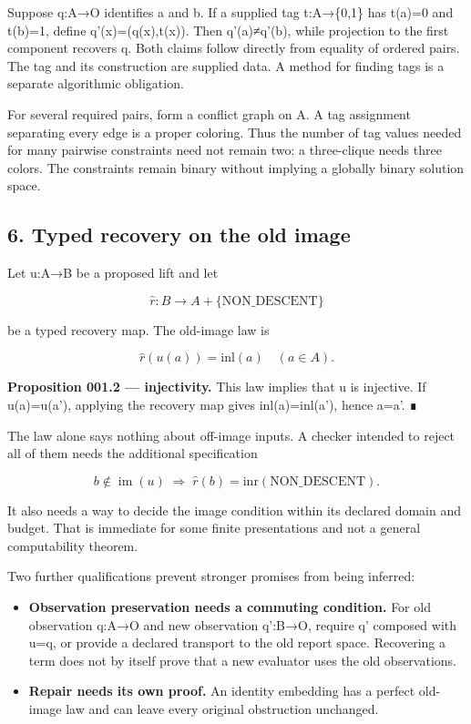 \documentclass[
  11pt,
]{article}
\providecommand{\tightlist}{%
  \setlength{\itemsep}{0pt}\setlength{\parskip}{0pt}}
\begin{document}
Suppose q:A→O identifies a and b. If a supplied tag t:A→\{0,1\} has
t(a)=0 and t(b)=1, define q'(x)=(q(x),t(x)). Then q'(a)≠q'(b), while
projection to the first component recovers q. Both claims follow
directly from equality of ordered pairs. The tag and its construction
are supplied data. A method for finding tags is a separate algorithmic
obligation.

For several required pairs, form a conflict graph on A. A tag assignment
separating every edge is a proper coloring. Thus the number of tag
values needed for many pairwise constraints need not remain two: a
three-clique needs three colors. The constraints remain binary without
implying a globally binary solution space.

\subsection{6. Typed recovery on the old
image}\label{typed-recovery-on-the-old-image}

Let u:A→B be a proposed lift and let

\[
\widehat r:B\to A+\{\mathrm{NON\_DESCENT}\}
\]

be a typed recovery map. The old-image law is

\[
\widehat r(u(a))=\mathrm{inl}(a)\quad(a\in A).
\]

\textbf{Proposition 001.2 --- injectivity.} This law implies that u is
injective. If u(a)=u(a'), applying the recovery map gives
inl(a)=inl(a'), hence a=a'. ∎

The law alone says nothing about off-image inputs. A checker intended to
reject all of them needs the additional specification

\[
b\notin\operatorname{im}(u)\;\Longrightarrow\;
\widehat r(b)=\mathrm{inr}(\mathrm{NON\_DESCENT}).
\]

It also needs a way to decide the image condition within its declared
domain and budget. That is immediate for some finite presentations and
not a general computability theorem.

Two further qualifications prevent stronger promises from being
inferred:

\begin{itemize}
\tightlist
\item
  \textbf{Observation preservation needs a commuting condition.} For old
  observation q:A→O and new observation q':B→O, require q' composed with
  u=q, or provide a declared transport to the old report space.
  Recovering a term does not by itself prove that a new evaluator uses
  the old observations.
\item
  \textbf{Repair needs its own proof.} An identity embedding has a
  perfect old-image law and can leave every original obstruction
  unchanged.
\end{itemize}
\end{document}
